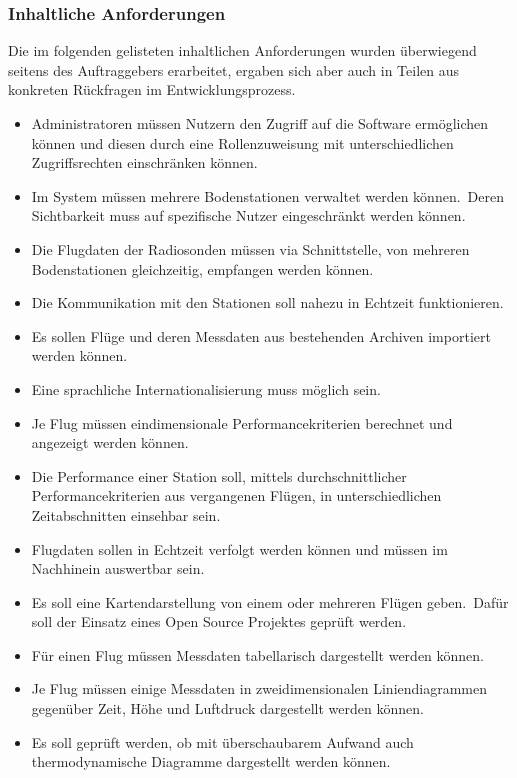 \newpage

\subsubsection{Inhaltliche Anforderungen}
Die im folgenden gelisteten inhaltlichen Anforderungen wurden überwiegend seitens des Auftraggebers erarbeitet, ergaben sich aber auch in Teilen aus konkreten Rückfragen im Entwicklungsprozess.
\begin{itemize}
    \item Administratoren müssen Nutzern den Zugriff auf die Software ermöglichen können und diesen durch eine Rollenzuweisung mit unterschiedlichen Zugriffsrechten einschränken können.
    \item Im System müssen mehrere Bodenstationen verwaltet werden können.\ Deren Sichtbarkeit muss auf spezifische Nutzer eingeschränkt werden können.
    \item Die Flugdaten der Radiosonden müssen via Schnittstelle, von mehreren Bodenstationen gleichzeitig, empfangen werden können.
    \item Die Kommunikation mit den Stationen soll nahezu in Echtzeit funktionieren.
    \item Es sollen Flüge und deren Messdaten aus bestehenden Archiven importiert werden können.
    \item Eine sprachliche Internationalisierung muss möglich sein.
    \item Je Flug müssen eindimensionale Performancekriterien berechnet und angezeigt werden können.
    \item Die Performance einer Station soll, mittels durchschnittlicher Performancekriterien aus vergangenen Flügen, in unterschiedlichen Zeitabschnitten einsehbar sein.
    \item Flugdaten sollen in Echtzeit verfolgt werden können und müssen im Nachhinein auswertbar sein.
    \item Es soll eine Kartendarstellung von einem oder mehreren Flügen geben.\ Dafür soll der Einsatz eines Open Source Projektes\cite{sondehub-tracker} geprüft werden.
    \item Für einen Flug müssen Messdaten tabellarisch dargestellt werden können.
    \item Je Flug müssen einige Messdaten in zweidimensionalen Liniendiagrammen gegenüber Zeit, Höhe und Luftdruck dargestellt werden können.
    \item Es soll geprüft werden, ob mit überschaubarem Aufwand auch thermodynamische Diagramme dargestellt werden können.
\end{itemize}
\newpage

